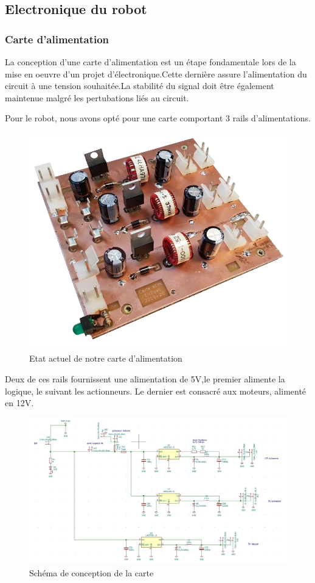 \documentclass[a4paper,10pt]{article}
\begin{document}
\begin{spacing}{1.5}
\subsection{Electronique du robot}
\subsubsection{Carte d'alimentation}

La conception d'une carte d'alimentation est un étape fondamentale lors de la
mise en oeuvre d'un projet d'électronique.Cette dernière assure l'alimentation
du circuit à une tension souhaitée.La stabilité du signal doit être également
maintenue malgré les pertubations liés au circuit.

Pour le robot, nous avons opté pour une carte comportant 3 rails
d'alimentations.

\begin{figure}[H]
  \center
  \includegraphics[scale=0.3]{carte.png}
  \caption{Etat actuel de notre carte d'alimentation}
\end{figure}

Deux de ces rails fournissent une alimentation de 5V,le premier alimente la
logique, le suivant les actionneurs. Le dernier est consacré aux moteurs,
alimenté en 12V.

\begin{figure}[H]
  \center
  \includegraphics[scale=0.5]{schema.jpg}
  \caption{Schéma de conception de la carte}
\end{figure}


\end{spacing}
\end{document}
